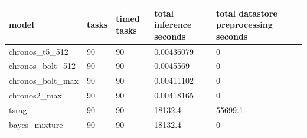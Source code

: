 \begin{tabular}{lllll}
\toprule
model & tasks & timed tasks & total inference seconds & total datastore preprocessing seconds \\
\midrule
chronos\_t5\_512 & 90 & 90 & 0.00436079 & 0 \\
chronos\_bolt\_512 & 90 & 90 & 0.0045569 & 0 \\
chronos\_bolt\_max & 90 & 90 & 0.00411102 & 0 \\
chronos2\_max & 90 & 90 & 0.00418165 & 0 \\
tsrag & 90 & 90 & 18132.4 & 55699.1 \\
bayes\_mixture & 90 & 90 & 18132.4 & 0 \\
\bottomrule
\end{tabular}
